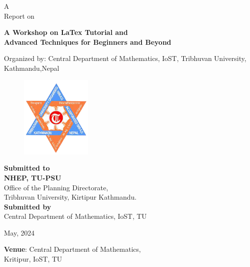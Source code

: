 \documentclass[a4paper,12pt]{report}
\begin{document}
\thispagestyle{empty}
\vspace*{4mm}
\begin{center}
  {\Large
  A\\
  Report on}\\[3mm]
  \begin{tcolorbox}[colback=blue!20, colframe=blue!20]
    \centering
  {\bfseries \Large  A Workshop on LaTex Tutorial and \\[3mm]
    Advanced Techniques for Beginners and Beyond}
  \end{tcolorbox}
\vspace{7mm}
    Organized by: \textcolor{blue!50!cyan}{Central Department of Mathematics, IoST, Tribhuvan University, Kathmandu,Nepal}

    \vspace{7mm}
    \begin{figure}[h!]
      \centering
      \includegraphics[width=3.5cm, height=4cm]{tulogo1.png}
    \end{figure}

    \vspace{17mm}

    {\bfseries \Large Submitted to} \\[5mm]

    \textbf{NHEP, TU-PSU}\\
    Office of the Planning Directorate,\\
    Tribhuvan University, Kirtipur Kathmandu.\\[10mm]

     {\bfseries Submitted by} \\[1mm]
     \textcolor{blue!60!cyan}{Central Department of Mathematics, IoST, TU}

     \vspace{10mm}
     May, 2024
     \vspace{3mm}
     \begin{tcolorbox}[colback=blue!20, colframe=blue!20]
       \Large \centering
       \textbf{Venue}: \hspace{2mm} Central Department of Mathematics, \\
       Kritipur, IoST, TU
     \end{tcolorbox}

\end{center}
\clearpage
\end{document}

